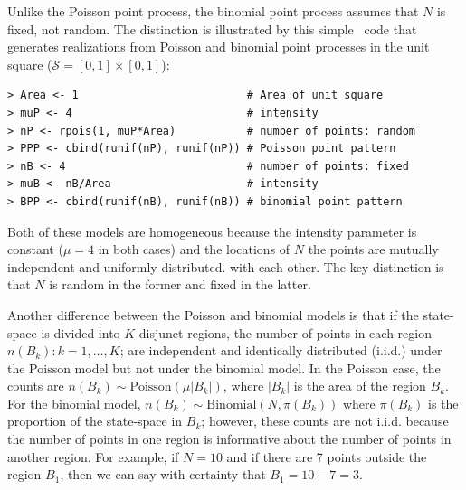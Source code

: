 Unlike the Poisson point process, the
binomial point process assumes that $N$ is fixed, not random.
The distinction is illustrated by this simple \R~code that generates
realizations from Poisson and binomial point processes in the unit
square ($\mathcal{S} = [0,1]\times[0,1]$):
\begin{small}
\begin{verbatim}
> Area <- 1                          # Area of unit square
> muP <- 4                           # intensity
> nP <- rpois(1, muP*Area)           # number of points: random
> PPP <- cbind(runif(nP), runif(nP)) # Poisson point pattern
> nB <- 4                            # number of points: fixed
> muB <- nB/Area                     # intensity
> BPP <- cbind(runif(nB), runif(nB)) # binomial point pattern
\end{verbatim}
\end{small}
Both of these models are homogeneous because the intensity parameter
is constant ($\mu=4$ in both cases) and the locations of $N$ the
points are mutually independent and uniformly distributed.
with each other. %
The key distinction
is that $N$ is random in the former and fixed in the latter.%

Another difference between the Poisson and binomial models is that if the
state-space is divided into $K$ disjunct regions, the number of points in each
region $n(B_k): k=1,\dots,K$; are independent and identically
distributed (i.i.d.) under the Poisson model but not under the
binomial model. In the Poisson case,
the counts are %
$n(B_k) \sim
\text{Poisson}(\mu|B_k|)$, where $|B_k|$ is the area of the region
$B_k$. For the binomial model, $n(B_k) \sim
\text{Binomial}(N, \pi(B_k))$ where $\pi(B_k)$ is the proportion of
the state-space in $B_k$; however, these counts are not
i.i.d. because the number of points in one region is informative
about the number of points in another region. For example, if
$N=10$ %
and if %
there are 7 points outside the region $B_1$,
then we can say with certainty that $B_1 = 10 - 7 = 3$.

